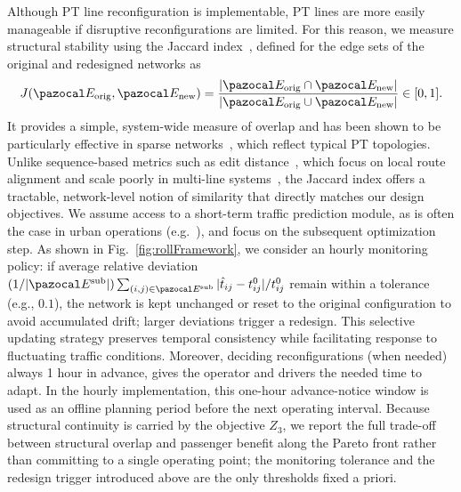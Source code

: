 \documentclass[a4paper,fleqn]{cas-sc}
\begin{document}
Although PT line reconfiguration is implementable, PT lines are more easily manageable if disruptive reconfigurations are limited. For this reason, we measure structural stability using the Jaccard index~\citep{jaccard1901etude}, defined for the edge sets of the original and redesigned networks as
\begin{equation}
J(\pazocal E_{\text{orig}},\pazocal E_{\text{new}})
=\frac{|\pazocal E_{\text{orig}}\cap \pazocal E_{\text{new}}|}
       {|\pazocal E_{\text{orig}}\cup \pazocal E_{\text{new}}|}\in[0,1].
\label{eq:jaccard}
\end{equation}
It provides a simple, system-wide measure of overlap and has been shown to be particularly effective in sparse networks~\citep{travieso2024analytical}, which reflect typical PT topologies. Unlike sequence-based metrics such as edit distance~\citep{cheng2025computing}, which focus on local route alignment and scale poorly in multi-line systems~\citep{jain2024graph}, the Jaccard index offers a tractable, network-level notion of similarity that directly matches our design objectives.
%
We assume access to a short-term traffic prediction module, as is often the case in urban operations (e.g.~\citep{MTASchedules,TfLLiveBusArrivals}), and focus on the subsequent optimization step. As shown in Fig.~\ref{fig:rollFramework}, we consider an hourly monitoring policy: if average relative deviation $(1/|\pazocal E^\text{sub}|)  \sum_{(i,j)\in\pazocal E^\text{sub}}|\hat t_{ij}-t_{ij}^0|/t_{ij}^0$ remain within a tolerance (e.g., $0.1$), the network is kept unchanged or reset to the original configuration to avoid accumulated drift; larger deviations trigger a redesign. This selective updating strategy preserves temporal consistency while facilitating response to fluctuating traffic conditions. Moreover, deciding reconfigurations (when needed) always 1 hour in advance, gives the operator and drivers the needed time to adapt. In the hourly implementation, this one-hour advance-notice window is used as an offline planning period before the next operating interval. Because structural continuity is carried by the objective $Z_3$, we report the full trade-off between structural overlap and passenger benefit along the Pareto front rather than committing to a single operating point; the monitoring tolerance and the redesign trigger introduced above are the only thresholds fixed a priori.
\end{document}
